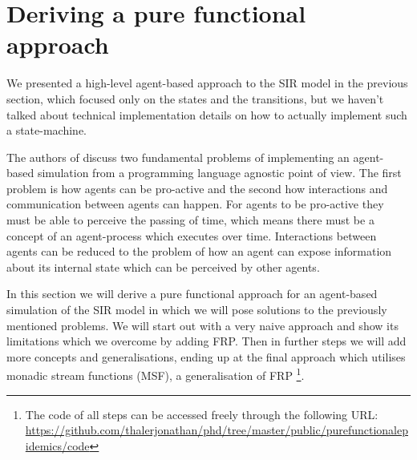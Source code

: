 \section{Deriving a pure functional approach}
\label{sec:functional_approach}

We presented a high-level agent-based approach to the SIR model in the previous section, which focused only on the states and the transitions, but we haven't talked about technical implementation details on how to actually implement such a state-machine.

The authors of \cite{thaler_art_2017} discuss two fundamental problems of implementing an agent-based simulation from a programming language agnostic point of view. The first problem is how agents can be pro-active and the second how interactions and communication between agents can happen. For agents to be pro-active they must be able to perceive the passing of time, which means there must be a concept of an agent-process which executes over time. Interactions between agents can be reduced to the problem of how an agent can expose information about its internal state which can be perceived by other agents.

In this section we will derive a pure functional approach for an agent-based simulation of the SIR model in which we will pose solutions to the previously mentioned problems. We will start out with a very naive approach and show its limitations which we overcome by adding FRP. Then in further steps we will add more concepts and generalisations, ending up at the final approach which utilises monadic stream functions (MSF), a generalisation of FRP 
\footnote{The code of all steps can be accessed freely through the following URL: \url{https://github.com/thalerjonathan/phd/tree/master/public/purefunctionalepidemics/code}}.







